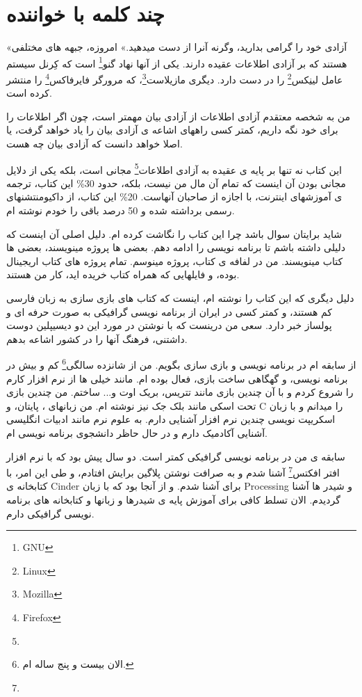 \documentclass[14pt,a4paper]{memoir}
\begin{document}
	 
	 \tableofcontents
	 \mainmatter
	 
	 \chapter{چند کلمه با خواننده} \label{foreword}

	«آزادی خود را گرامی بدارید، وگرنه آنرا از دست میدهید.»
	امروزه، جبهه های مختلفی هستند که بر آزادی اطلاعات عقیده دارند. یکی از آنها نهاد گنو\footnote{GNU} است که کِرنل سیستم عامل لینِکس\footnote{Linux} را در دست دارد. دیگری مازیلاست\footnote{Mozilla}، که مرورگر فایرفاکس\footnote{Firefox} را منتشر کرده است. 
	
	من به شخصه معتقدم آزادی اطلاعات از آزادی بیان مهمتر است، چون اگر اطلاعات را برای خود نگه داریم، کمتر کسی راههای اشاعه ی آزادی بیان را یاد خواهد گرفت، یا اصلا خواهد دانست که آزادی بیان چه هست. 
	
	این کتاب نه تنها بر پایه ی عقیده به آزادی اطلاعات\footnote{} مجانی است، بلکه یکی از دلایل مجانی بودن آن اینست که تمام آن مال من نیست، بلکه، حدود 30\% این کتاب، ترجمه ی آموزشهای اینترنت، با اجازه از صاحبان آنهاست. 20\% این کتاب، از داکیومنتشنهای رسمی برداشته شده  و 50 درصد باقی را خودم نوشته ام.
	
	شاید برایتان سوال باشد چرا این کتاب را نگاشت کرده ام. دلیل اصلی آن اینست که دلیلی داشته باشم تا برنامه نویسی را ادامه دهم. بعضی ها پروژه مینویسند، بعضی ها کتاب مینویسند. من در لفافه ی کتاب، پروژه مینوسم. تمام پروژه های کتاب اریجینال بوده، و فایلهایی که همراه کتاب خریده اید، کار من هستند.
	
	دلیل دیگری که این کتاب را نوشته ام، اینست که کتاب های بازی سازی به زبان فارسی کم هستند، و کمتر کسی در ایران از برنامه نویسی گرافیکی به صورت حرفه ای و پولساز خبر دارد. سعی من درینست که با نوشتن در مورد این دو دیسیپلین دوست داشتنی، فرهنگ آنها را در کشور اشاعه بدهم.
	
	از سابقه ام در برنامه نویسی و بازی سازی بگویم. من از شانزده سالگی\footnote{الان بیست و پنج ساله ام.} کم و بیش در برنامه نویسی، و گهگاهی ساخت بازی، فعال بوده ام. مانند خیلی ها از نرم افزار  کارم را شروع کردم و با آن چندین بازی مانند تتریس، بریک اوت و... ساختم. من چندین بازی تحت اسکی مانند بلک جک نیز نوشته ام. من زبانهای ، پایتان، و C را میدانم و با زبان اسکریپت نویسی چندین نرم افزار آشنایی دارم. به علوم نرم مانند ادبیات انگلیسی آشنایی آکادمیک دارم و در حال حاظر دانشجوی برنامه نویسی ام.
	
	سابقه ی من در برنامه نویسی گرافیکی کمتر است. دو سال پیش بود که با نرم افزار افتر افکتس\footnote{} آشنا شدم و به صرافت نوشتن پلاگین برایش افتادم، و طی این امر، با کتابخانه ی Cinder برای  آشنا شدم. و از آنجا بود که با زبان Processing و شیدر ها آشنا گردیدم. الان تسلط کافی برای آموزش پایه ی شیدرها و زبانها و کتابخانه های برنامه نویسی گرافیکی دارم.
	
\end{document}
